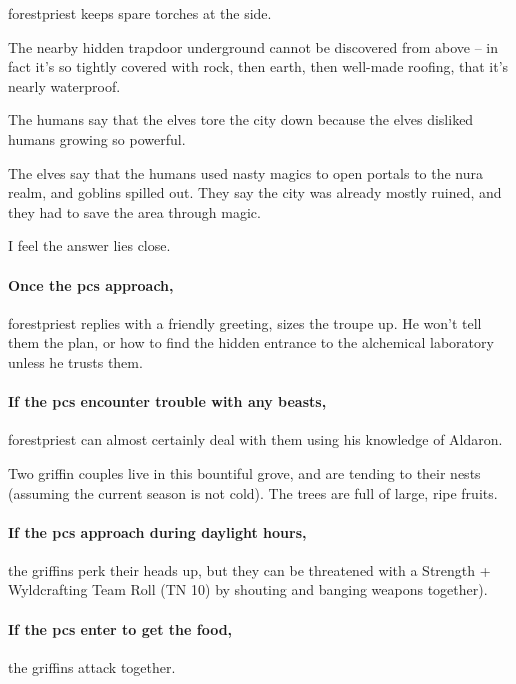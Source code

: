 \Gls{forestpriest} keeps spare torches at the side.

The nearby hidden trapdoor underground cannot be discovered from above -- in fact it's so tightly covered with rock, then earth, then well-made roofing, that it's nearly waterproof.

\begin{speechtext}

  The humans say that the elves tore the city down because the elves disliked humans growing so powerful.

  The elves say that the humans used nasty magics to open portals to the nura realm, and goblins spilled out.
  They say the city was already mostly ruined, and they had to save the area through magic.

  I feel the answer lies close.

\end{speechtext}

\paragraph{Once the \glspl{pc} approach,}
\gls{forestpriest} replies with a friendly greeting, sizes the troupe up.
He won't tell them the plan, or how to find the hidden entrance to the alchemical laboratory unless he trusts them.

\paragraph{If the \glspl{pc} encounter trouble with any beasts,}
\gls{forestpriest} can almost certainly deal with them using his knowledge of Aldaron.


Two griffin couples live in this bountiful grove, and are tending to their nests (assuming the current season is not cold).
The trees are full of large, ripe fruits.


\paragraph{If the \glspl{pc} approach during daylight hours,}
the griffins perk their heads up, but they can be threatened with a Strength + Wyldcrafting Team Roll (TN 10) by shouting and banging weapons together).

\paragraph{If the \glspl{pc} enter to get the food,}
the griffins attack together.

